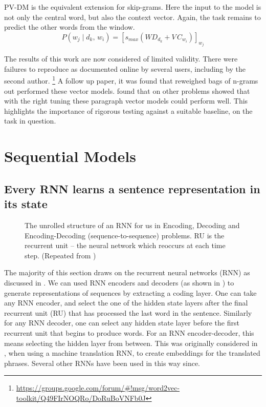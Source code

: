 \documentclass[12pt,parskip]{komatufte}
\begin{document}

PV-DM is the equivalent extension for skip-grams.
Here the input to the model is not only the central word, but also the context vector.
Again, the task remains to predict the other words from the window.
\begin{equation}
P(w_j \mid d_k,\, w_{i}) = \left[ s_{max}(WD_{d_k} + V\,C_{w_{i}}) \right]_{w_j} 
\end{equation}


The results of this work are now considered of limited validity.
There were failures to reproduce as documented online by several users,
including by the second author.
 \footnote{ \url{https://groups.google.com/forum/\#!msg/word2vec-toolkit/Q49FIrNOQRo/DoRuBoVNFb0J}}
A follow up paper,  it was found that reweighed bags of n-grams  out performed these vector models.
\textcite{lau2016doc2vecissues} found that on other problems  showed that with the right tuning these paragraph vector models could perform well.
This highlights the importance of rigorous testing against a suitable baseline, on the task in question.




\section{Sequential Models}

\subsection{Every RNN learns a sentence representation in its state}
\begin{figure}
	\caption{The unrolled structure of an RNN for us in Encoding, Decoding and Encoding-Decoding (sequence-to-sequence) problems. RU is the recurrent unit -- the neural network which reoccurs at each time step. (Repeated from )
	}
	\label{fig-rnns-sq}
	
	\resizebox{\textwidth}{!}{}
\end{figure}

The majority of this section draws on the recurrent neural networks (RNN) as discussed in .
We can used RNN encoders and decoders (as shown in ) to generate representations of sequences by extracting a coding layer.
One can take any RNN encoder,
and select the one of the hidden state layers after the final recurrent unit (RU) that has processed the last word in the sentence.
Similarly for any RNN decoder, one can select any hidden state layer before the first recurrent unit that begins to produce words.
For an RNN encoder-decoder, this means selecting the hidden layer from between.
This was originally considered in , when using a machine translation RNN, to create embeddings for the translated phrases.
Several other RNNs have been used in this way since.
\end{document}
